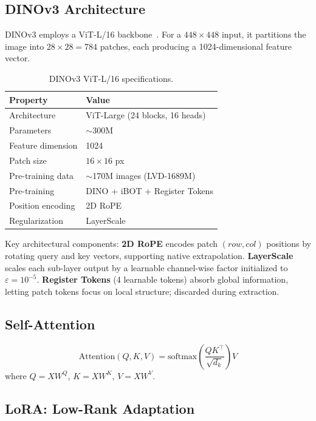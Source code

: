 \documentclass[11pt,a4paper]{article}
\begin{document}
\subsection{DINOv3 Architecture}

DINOv3 employs a ViT-L/16 backbone~\cite{vit}. For a $448\times448$ input, it partitions the image into $28\times28 = 784$ patches, each producing a 1024-dimensional feature vector.

\begin{table}[t]
\centering\small
\caption{DINOv3 ViT-L/16 specifications.}
\label{tab:dinov3_params}
\begin{tabular}{@{}ll@{}}
\toprule
\textbf{Property} & \textbf{Value} \\
\midrule
Architecture      & ViT-Large (24 blocks, 16 heads) \\
Parameters        & $\sim$300M \\
Feature dimension & 1024 \\
Patch size        & $16\!\times\!16$ px \\
Pre-training data & $\sim$170M images (LVD-1689M) \\
Pre-training      & DINO + iBOT + Register Tokens \\
Position encoding & 2D RoPE \\
Regularization    & LayerScale \\
\bottomrule
\end{tabular}
\end{table}

Key architectural components: \textbf{2D RoPE} encodes patch $(row, col)$ positions by rotating query and key vectors, supporting native extrapolation. \textbf{LayerScale} scales each sub-layer output by a learnable channel-wise factor initialized to $\varepsilon = 10^{-5}$. \textbf{Register Tokens} (4 learnable tokens) absorb global information, letting patch tokens focus on local structure; discarded during extraction.

\subsection{Self-Attention}
\begin{equation}
\text{Attention}(Q, K, V) = \text{softmax}\!\left(\frac{QK^\top}{\sqrt{d_k}}\right)V
\end{equation}
where $Q = XW^Q$, $K = XW^K$, $V = XW^V$.

\subsection{LoRA: Low-Rank Adaptation}
\end{document}
